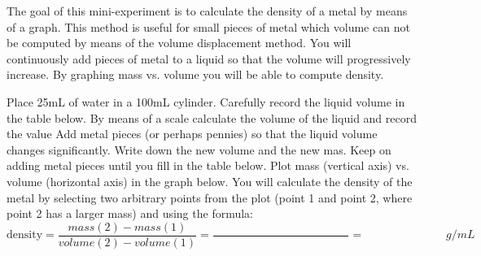 \documentclass[main.tex]{subfiles}
\begin{document}
\begin{fullwidth}
\vspace{0.2cm}{\large \bfseries 5. Density by graphing }
The goal of this mini-experiment is to calculate the density of a metal by means of a graph. This method is useful for small pieces of metal which volume can not be computed by means of the volume displacement method. You will continuously add pieces of metal to a liquid so that the volume will progressively increase.  By graphing mass vs. volume you will be able to compute density.
\begin{steps}
        \newstep[]  Place 25mL of water in a 100mL cylinder. Carefully record the liquid volume in the table below.
    \newstep[] By means of a scale calculate the volume of the liquid and record the value      
    \newstep[] Add metal pieces (or perhaps pennies) so that the liquid volume changes significantly. Write down the new volume and the new mas.
            \newstep[] Keep on adding metal pieces until you fill in the table below.
               \newstep[] Plot mass (vertical axis) vs. volume (horizontal axis) in the graph below.
  \newstep[] You will calculate the density of the metal by selecting two arbitrary points from the plot (point 1 and point 2, where point 2 has a larger mass) and using the formula:
\begin{equation*}
\text{density}=\frac{mass(2)-mass(1)}{volume(2)-volume(1)}=\frac{\hspace{5cm}}{}=\hspace{3cm} g/mL
\end{equation*}
\end{steps}


\end{fullwidth}
\end{document}
